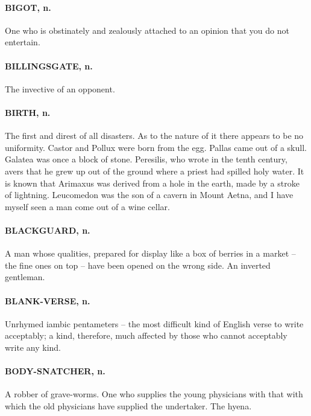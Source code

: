 \documentclass[11pt]{article}
\begin{document}
\paragraph{BIGOT, n.}  One who is obstinately and zealously attached to an opinion
that you do not entertain.

\paragraph{BILLINGSGATE, n.}  The invective of an opponent.

\paragraph{BIRTH, n.}  The first and direst of all disasters.  As to the nature of
it there appears to be no uniformity.  Castor and Pollux were born
from the egg.  Pallas came out of a skull.  Galatea was once a block
of stone.  Peresilis, who wrote in the tenth century, avers that he
grew up out of the ground where a priest had spilled holy water.  It
is known that Arimaxus was derived from a hole in the earth, made by a
stroke of lightning.  Leucomedon was the son of a cavern in Mount
Aetna, and I have myself seen a man come out of a wine cellar.

\paragraph{BLACKGUARD, n.}  A man whose qualities, prepared for display like a box
of berries in a market -- the fine ones on top -- have been opened on
the wrong side.  An inverted gentleman.

\paragraph{BLANK-VERSE, n.}  Unrhymed iambic pentameters -- the most difficult
kind of English verse to write acceptably; a kind, therefore, much
affected by those who cannot acceptably write any kind.

\paragraph{BODY-SNATCHER, n.}  A robber of grave-worms.  One who supplies the
young physicians with that with which the old physicians have supplied
the undertaker.  The hyena.
\end{document}
